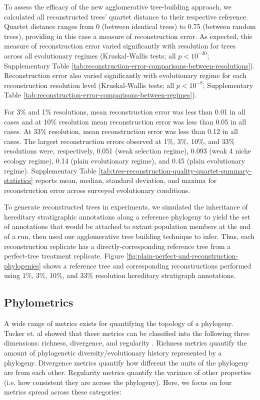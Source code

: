 To assess the efficacy of the new agglomerative tree-building approach, we calculated all reconstructed trees' quartet distance to their respective reference.
Quartet distance ranges from 0 (between identical trees) to 0.75 (between random trees), providing in this case a measure of reconstruction error.
As expected, this measure of reconstruction error varied significantly with resolution for trees across all evolutionary regimes (Kruskal-Wallis tests; all $p < 10^{-20}$; Supplementary Table \ref{tab:reconstruction-error-comparisons-between-resolutions}).
Reconstruction error also varied significantly with evolutionary regime for each reconstruction resolution level (Kruskal-Wallis tests; all $p < 10^{-8}$; Supplementary Table \ref{tab:reconstruction-error-comparisons-between-regimes}).

For 3\% and 1\% resolutions, mean reconstruction error was less than 0.01 in all cases and at 10\% resolution mean reconstruction error was less than 0.05 in all cases.
At 33\% resolution, mean reconstruction error was less than 0.12 in all cases.
The largest reconstruction errors observed at 1\%, 3\%, 10\%, and 33\% resolutions were, respectively, 0.051 (weak selection regime), 0.093 (weak 4 niche ecology regime), 0.14 (plain evolutionary regime), and 0.45 (plain evolutionary regime).
Supplementary Table \ref{tab:tree-reconstruction-quality-quartet-summary-statistics} reports mean, median, standard deviation, and maxima for reconstruction error across surveyed evolutionary conditions.

To generate reconstructed trees in experiments, we simulated the inheritance of hereditary stratigraphic annotations along a reference phylogeny to yield the set of annotations that would be attached to extant population members at the end of a run, then used our agglomerative tree building technique to infer.
Thus, each reconstruction replicate has a directly-corresponding reference tree from a perfect-tree treatment replicate.
Figure \ref{fig:plain-perfect-and-reconstruction-phylogenies} shows a reference tree and corresponding reconstructions performed using 1\%, 3\%, 10\%, and 33\% resolution hereditary stratigraph annotations.

\subsection{Phylometrics}

A wide range of metrics exists for quantifying the topology of a phylogeny.
Tucker et. al showed that these metrics can be classified into the following three dimensions: richness, divergence, and regularity \citep{tuckerGuidePhylogeneticMetrics2017}.
Richness metrics quantify the amount of phylogenetic diversity/evolutionary history represented by a phylogeny.
Divergence metrics quantify how different the units of the phylogeny are from each other.
Regularity metrics quantify the variance of other properties (i.e. how consistent they are across the phylogeny).
Here, we focus on four metrics spread across these categories:

